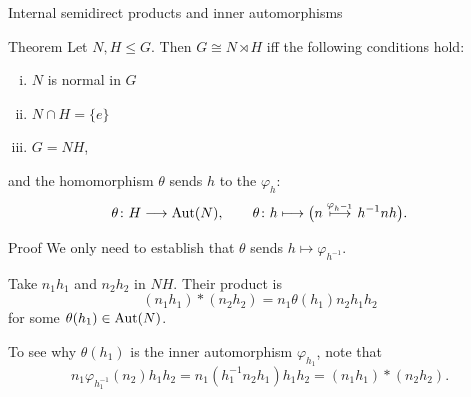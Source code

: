 \documentclass[8pt, handout]{beamer}
\newcommand{\Pause}{}      %
\begin{document}
\begin{frame}{Internal semidirect products and inner automorphisms}

  \begin{block}{Theorem}
    Let $N,H\leq G$. Then $G\cong N\rtimes H$ iff the following
    conditions hold:
    \begin{enumerate}[(i)]
    \item $N$ is normal in $G$
    \item $N\cap H=\{e\}$
    \item $G=NH$,
    \end{enumerate}
    and the homomorphism $\theta$ sends $h$ to the 
    $\varphi_h$:
    \[
    \theta\colon H\longrightarrow\operatorname{Aut}(N),\qquad
    \theta\colon h\longmapsto
    \big(n\stackrel{\varphi_{h^{-1}}}{\longmapsto}h^{-1}nh
    \big).
    \]
  \end{block}

  \Pause
  
  \begin{exampleblock}{Proof}
    We only need to establish that $\theta$ sends
    $h\mapsto\varphi_{h^{-1}}$. \medskip\Pause

    Take $n_1h_1$ and $n_2h_2$ in $NH$. \Pause Their product is
    \[
    (n_1h_1)*(n_2h_2)=n_1\theta(h_1)n_2h_1h_2
    \]
    for some $\theta(h_1)\in\operatorname{Aut}(N)$. \medskip\Pause

    To see why $\theta(h_1)$ is the inner automorphism $\varphi_{h_1}$, note that
    \[
    n_1\varphi_{h_1^{-1}}(n_2)h_1h_2=n_1(h_1^{-1}n_2h_1)h_1h_2=
    (n_1h_1)*(n_2h_2). \tag*{$\Box$}
    \]
  \end{exampleblock}
  
\end{frame}


\end{document}

